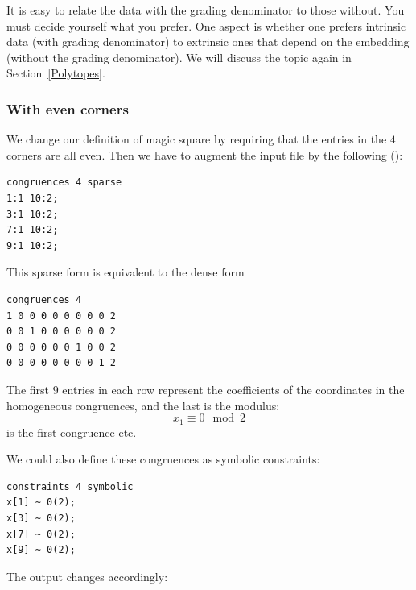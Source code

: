 It is easy to relate the data with the grading denominator to those without. You must decide yourself what you prefer. One aspect is whether one prefers intrinsic data (with grading denominator) to extrinsic ones that depend on the embedding (without the grading denominator). We will discuss the topic again in Section~\ref{Polytopes}.

\subsubsection{With even corners}\label{magiceven}\label{cong_ex}

We change our definition of magic square by requiring that the
entries in the $4$ corners are all even. Then we have to
augment the input file by the following ():
\begin{Verbatim}
congruences 4 sparse
1:1 10:2;
3:1 10:2;
7:1 10:2;
9:1 10:2;
\end{Verbatim}
This sparse form is equivalent to the dense form
\begin{Verbatim}
congruences 4
1 0 0 0 0 0 0 0 0 2
0 0 1 0 0 0 0 0 0 2
0 0 0 0 0 0 1 0 0 2
0 0 0 0 0 0 0 0 1 2
\end{Verbatim}
The first $9$ entries in each row represent the coefficients of the coordinates in the homogeneous congruences, and the last is the modulus:
$$
x_1\equiv 0\mod 2
$$
is the first congruence etc.

We could also define these congruences as symbolic constraints:
\begin{Verbatim}
constraints 4 symbolic
x[1] ~ 0(2);
x[3] ~ 0(2);
x[7] ~ 0(2);
x[9] ~ 0(2);
\end{Verbatim}

The output changes accordingly:


